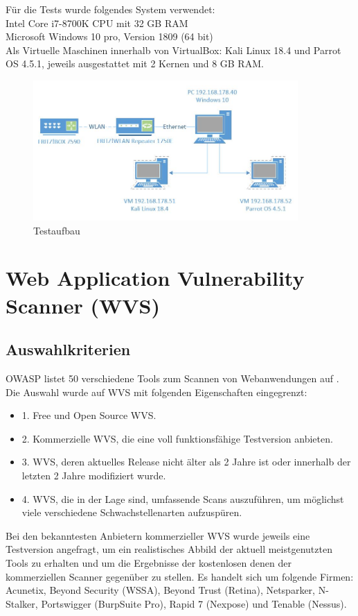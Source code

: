 \documentclass[12pt,oneside,a4paper,parskip,pointlessnumbers]{scrbook}
\begin{document}
  Für die Tests wurde folgendes System verwendet:
  \\Intel Core i7-8700K CPU mit 32 GB RAM
  \\Microsoft Windows 10 pro, Version 1809 (64 bit)
  \\Als Virtuelle Maschinen innerhalb von VirtualBox: Kali Linux 18.4 und Parrot OS 4.5.1, jeweils ausgestattet mit 2 Kernen und 8 GB RAM.
  \begin{figure}[H]
    \centering
    \includegraphics[width=0.9\textwidth]{Images/Visio}
    \caption[Testaufbau]{Testaufbau}
  \end{figure}
\section{Web Application Vulnerability Scanner (WVS)}
  \subsection{Auswahlkriterien}
  OWASP listet 50 verschiedene Tools zum Scannen von Webanwendungen auf
  \cite{OWASPtools}. Die Auswahl wurde auf WVS mit folgenden Eigenschaften eingegrenzt:
  \begin{itemize}
    \item 1. Free und Open Source WVS.
    \item 2. Kommerzielle WVS, die eine voll funktionsfähige Testversion anbieten.
    \item 3. WVS, deren aktuelles Release nicht älter als 2 Jahre ist oder innerhalb der letzten 2 Jahre modifiziert wurde.
    \item 4. WVS, die in der Lage sind, umfassende Scans auszuführen, um möglichst viele verschiedene Schwachstellenarten aufzuspüren.
  \end{itemize}
  Bei den bekanntesten Anbietern kommerzieller WVS wurde jeweils eine Testversion angefragt, um ein realistisches Abbild der aktuell meistgenutzten Tools zu erhalten und um die Ergebnisse der kostenlosen denen der kommerziellen Scanner gegenüber zu stellen. Es handelt sich um folgende Firmen:
  \\Acunetix, Beyond Security (WSSA), Beyond Trust (Retina), Netsparker, N-Stalker, Portswigger (BurpSuite Pro), Rapid 7 (Nexpose) und Tenable (Nessus).
\end{document}
